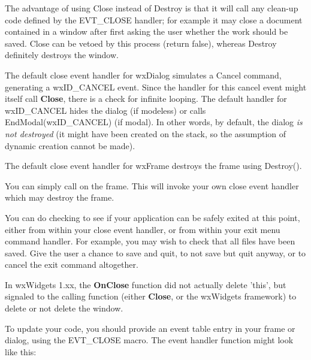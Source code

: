 The advantage of using Close instead of Destroy is that it will call any clean-up code
defined by the EVT\_CLOSE handler; for example it may close a document contained in
a window after first asking the user whether the work should be saved. Close can be vetoed
by this process (return false), whereas Destroy definitely destroys the window.


The default close event handler for wxDialog simulates a Cancel command,
generating a wxID\_CANCEL event. Since the handler for this cancel event might
itself call {\bf Close}, there is a check for infinite looping. The default handler
for wxID\_CANCEL hides the dialog (if modeless) or calls EndModal(wxID\_CANCEL) (if modal).
In other words, by default, the dialog {\it is not destroyed} (it might have been created
on the stack, so the assumption of dynamic creation cannot be made).

The default close event handler for wxFrame destroys the frame using Destroy().


You can simply call  on the frame. This
will invoke your own close event handler which may destroy the frame.

You can do checking to see if your application can be safely exited at this point,
either from within your close event handler, or from within your exit menu command
handler. For example, you may wish to check that all files have been saved.
Give the user a chance to save and quit, to not save but quit anyway, or to cancel
the exit command altogether.


In wxWidgets 1.xx, the {\bf OnClose} function did not actually delete 'this', but signaled
to the calling function (either {\bf Close}, or the wxWidgets framework) to delete
or not delete the window.

To update your code, you should provide an event table entry in your frame or
dialog, using the EVT\_CLOSE macro. The event handler function might look like this:

